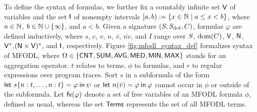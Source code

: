 To define the syntax of formulas, we further fix a countably infinite set \(\mathsf{V}\) of variables and the set \(\mathsf{I}\) of nonempty intervals \([a,b) := \{x \in \mathbb{N} \mid a \leq x < b\}\), where \(a \in \mathbb{N}\), \(b \in \mathbb{N} \cup \{\infty\}\), and \(a < b\). Given a signature $(S,S_{\mathrm{def}},C)$, formulas \(\varphi\) are defined inductively, where $s$, $c$, \(v\), \(n\), \(\bar{v}\), \(\bar{nv}\), and \(I\) range over $S$, $\operatorname{dom}(C)$, $\mathsf{V}$, \(\mathsf{N}\), \(\mathsf{V}^*\),\((\mathsf{N}\times\mathsf{V})^*\), and \(\mathsf{I}\), respectively. Figure \ref{fig:mfodl_syntax_def} formalizes syntax of MFODL, where $\Omega\in\{\mathsf{CNT},\mathsf{SUM},\mathsf{AVG},\mathsf{MED},\mathsf{MIN},\mathsf{MAX}\}$ stands for an aggregation operator. $t$ relates to terms, $\phi$ to formulas, and $r$ to regular expressions over program traces. Sort $s$ in a subformula of the form $\mathbin{\mathsf{let}} \ s\{n:t,\ldots, n:t\} = \varphi \mathbin{\mathsf{in}} \psi$ or $\mathbin{\mathsf{let}} \ n(\bar{v}) = \varphi \mathbin{\mathsf{in}} \varphi$ cannot occur in $\phi$ or outside of the subformula. Let $\mathsf{fv}(\varphi)$ denote a set of free variables of an MFODL formula $\phi$, defined as usual, whereas the set $\mathsf{Terms}$ represents the set of all MFODL terms.


